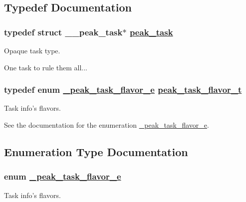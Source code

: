 \subsection{Typedef Documentation}
\hypertarget{group__task__common_ga0}{
\subsubsection[peak\_\-task]{\setlength{\rightskip}{0pt plus 5cm}typedef struct \_\-\_\-peak\_\-task$\ast$ \hyperlink{group__task__common_ga0}{peak\_\-task}}}
\label{group__task__common_ga0}


Opaque task type. 

One task to rule them all... \hypertarget{group__task__common_ga1}{
\subsubsection[peak\_\-task\_\-flavor\_\-t]{\setlength{\rightskip}{0pt plus 5cm}typedef enum \hyperlink{group__task__common_ga10}{\_\-peak\_\-task\_\-flavor\_\-e} \hyperlink{group__task__common_ga1}{peak\_\-task\_\-flavor\_\-t}}}
\label{group__task__common_ga1}


Task info's flavors. 

See the documentation for the enumeration \hyperlink{group__task__common_ga10}{\_\-peak\_\-task\_\-flavor\_\-e}. 

\subsection{Enumeration Type Documentation}
\hypertarget{group__task__common_ga10}{
\subsubsection[\_\-peak\_\-task\_\-flavor\_\-e]{\setlength{\rightskip}{0pt plus 5cm}enum \hyperlink{group__task__common_ga10}{\_\-peak\_\-task\_\-flavor\_\-e}}}
\label{group__task__common_ga10}


Task info's flavors. 

